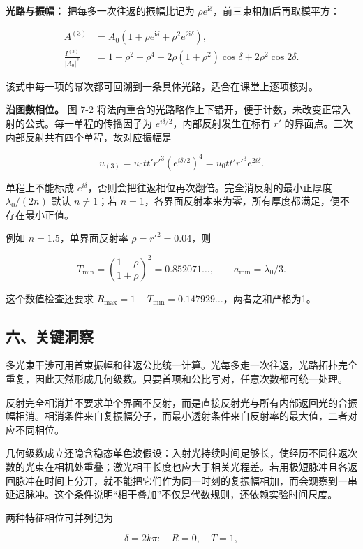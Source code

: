 \documentclass[12pt,a4paper,UTF8]{ctexart}
\begin{document}
\textbf{光路与振幅：} 把每多一次往返的振幅比记为
\(\rho e^{\mathrm i\delta}\)，前三束相加后再取模平方：

\[\begin{aligned}
A^{(3)}&=A_0\left(1+\rho e^{\mathrm i\delta}
+\rho^2e^{2\mathrm i\delta}\right),\\
\frac{I^{(3)}}{|A_0|^2}
&=1+\rho^2+\rho^4
+2\rho(1+\rho^2)\cos\delta
+2\rho^2\cos2\delta.
\end{aligned}\]

该式中每一项的幂次都可回溯到一条具体光路，适合在课堂上逐项核对。

\textbf{沿图数相位。} 图 7-2
将法向重合的光路略作上下错开，便于计数，未改变正常入射的公式。每一单程的传播因子为
\(e^{i\delta/2}\)，内部反射发生在标有 \(r'\)
的界面点。三次内部反射共有四个单程，故对应振幅是

\[u_{(3)}=u_0tt'r'^3(e^{i\delta/2})^4=u_0tt'r'^3e^{2i\delta}.\]

单程上不能标成
\(e^{i\delta}\)，否则会把往返相位再次翻倍。完全消反射的最小正厚度
\(\lambda_0/(2n)\) 默认 \(n\ne1\)；若
\(n=1\)，各界面反射本来为零，所有厚度都满足，便不存在最小正值。

例如 \(n=1.5\)，单界面反射率 \(\rho=r'^2=0.04\)，则

\[T_{\min}=\left(\frac{1-\rho}{1+\rho}\right)^2=0.852071\ldots,\qquad a_{\min}=\lambda_0/3.\]

这个数值检查还要求
\(R_{\max}=1-T_{\min}=0.147929\ldots\)，两者之和严格为1。

\subsection{六、关键洞察}\label{ux516dux5173ux952eux6d1eux5bdf-6}

多光束干涉可用首束振幅和往返公比统一计算。光每多走一次往返，光路拓扑完全重复，因此天然形成几何级数。只要首项和公比写对，任意次数都可统一处理。

反射完全相消并不要求单个界面不反射，而是直接反射光与所有内部返回光的合振幅相消。相消条件来自复振幅分子，而最小透射条件来自反射率的最大值，二者对应不同相位。

几何级数成立还隐含稳态单色波假设：入射光持续时间足够长，使经历不同往返次数的光束在相机处重叠；激光相干长度也应大于相关光程差。若用极短脉冲且各返回脉冲在时间上分开，就不能把它们作为同一时刻的复振幅相加，而会观察到一串延迟脉冲。这个条件说明``相干叠加''不仅是代数规则，还依赖实验时间尺度。

两种特征相位可并列记为

\[\delta=2k\pi:\quad R=0,\quad T=1,\]
\end{document}
